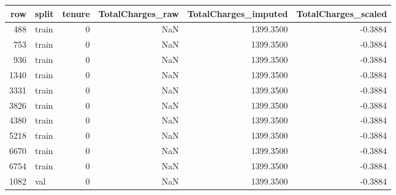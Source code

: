 \begin{tabular}{rlrrrr}
\toprule
row & split & tenure & TotalCharges\_raw & TotalCharges\_imputed & TotalCharges\_scaled \\
\midrule
488 & train & 0 & NaN & 1399.3500 & -0.3884 \\
753 & train & 0 & NaN & 1399.3500 & -0.3884 \\
936 & train & 0 & NaN & 1399.3500 & -0.3884 \\
1340 & train & 0 & NaN & 1399.3500 & -0.3884 \\
3331 & train & 0 & NaN & 1399.3500 & -0.3884 \\
3826 & train & 0 & NaN & 1399.3500 & -0.3884 \\
4380 & train & 0 & NaN & 1399.3500 & -0.3884 \\
5218 & train & 0 & NaN & 1399.3500 & -0.3884 \\
6670 & train & 0 & NaN & 1399.3500 & -0.3884 \\
6754 & train & 0 & NaN & 1399.3500 & -0.3884 \\
1082 & val & 0 & NaN & 1399.3500 & -0.3884 \\
\bottomrule
\end{tabular}
